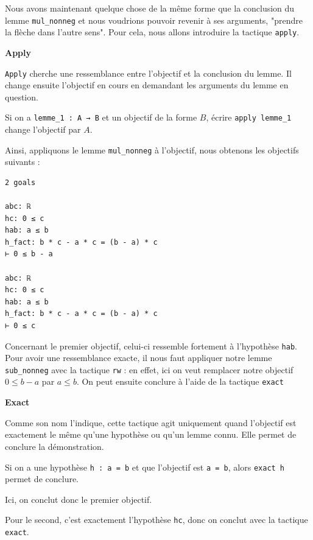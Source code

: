 \documentclass[a4paper, 11pt, twoside]{report}
\begin{document}
Nous avons maintenant quelque chose de la même forme que la conclusion du lemme \verb|mul_nonneg| et nous voudrions pouvoir revenir à ses arguments, "prendre la flèche dans l'autre sens". Pour cela, nous allons introduire la tactique \verb|apply|.

\begin{tactic}
	\centerline{\bfseries Apply}
	
	\verb|Apply| cherche une ressemblance entre l'objectif et la conclusion du lemme. Il change ensuite l'objectif en cours en demandant les arguments du lemme en question.
	
	\tcblower
	Si on a \verb|lemme_1 : A → B| et un objectif de la forme $B$,
	écrire \verb|apply lemme_1| change l'objectif par $A$.
\end{tactic}

Ainsi, appliquons le lemme \verb|mul_nonneg| à l'objectif, nous obtenons les objectifs suivants :

\begin{lstlisting}
2 goals

abc: ℝ
hc: 0 ≤ c
hab: a ≤ b
h_fact: b * c - a * c = (b - a) * c
⊢ 0 ≤ b - a

abc: ℝ
hc: 0 ≤ c
hab: a ≤ b
h_fact: b * c - a * c = (b - a) * c
⊢ 0 ≤ c
\end{lstlisting}

Concernant le premier objectif, celui-ci ressemble fortement à l'hypothèse \verb|hab|. Pour avoir une ressemblance exacte, il nous faut appliquer notre lemme \verb|sub_nonneg| avec la tactique \verb|rw| : en effet, ici on veut remplacer notre objectif $0\leq b-a$ par $a\leq b$. On peut ensuite conclure à l'aide de la tactique \verb|exact|

\begin{tactic}
	\centerline{\bfseries Exact}
	
	Comme son nom l'indique, cette tactique agit uniquement quand l'objectif est exactement le même qu'une hypothèse ou qu'un lemme connu. Elle permet de conclure la démonstration.
	
	\tcblower
	
	Si on a une hypothèse \verb|h : a = b| et que l'objectif est \verb|a = b|, alors \verb|exact h| permet de conclure.
\end{tactic}

Ici, on conclut donc le premier objectif. 

Pour le second, c'est exactement l'hypothèse \verb|hc|, donc on conclut avec la tactique \verb|exact|.
\end{document}
